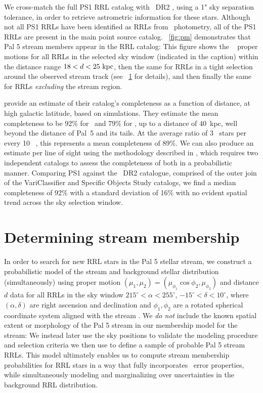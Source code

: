 \documentclass[twocolumn]{aastex63}
\begin{document}
We cross-match the full PS1 RRL catalog with \Gaia~DR2 \citep{Gaia:2018}, using a 1" sky separation tolerance, in order to retrieve astrometric information for these stars.
Although not all PS1 RRLs have been identified as RRLs from \Gaia\ photometry, all of the PS1 RRLs are present in the main point source catalog.
\figurename~\ref{fig:pm} demonstrates that Pal 5 stream members appear in the RRL catalog: This figure shows the \Gaia\  proper motions for all RRLs in the selected sky window (indicated in the caption) within the distance range $18 < d < 25~\mathrm{kpc}$, then the same for RRLs in a tight selection around the observed stream track (see \sectionname~\ref{sec:membership} for details), and then finally the same for RRLs \emph{excluding} the stream region.

\citet{Sesar:2017b} provide an estimate of their catalog's completeness as a function of distance, at high galactic latitude, based on simulations. They estimate the mean completeness to be 92\% for \rrab~and 79\% for \rrc, up to a distance of 40~kpc, well beyond the distance of Pal~5 and its tails. At the average ratio of 3 \rrc~stars per every 10 \rrab~\citep{Layden:1995}, this represents a mean completeness of 89\%. We can also produce an estimate per line of sight using the methodology described in \citet{Rybizki:2018}, which requires two independent catalogs to assess the completeness of both in a probabilistic manner. Comparing PS1 against the \Gaia~DR2 catalogue, comprised of the outer join of the VariClassifier \citep{Holl2018,Rimoldini2018} and Specific Objects Study \citep{Clementini2018} catalogs, we find a median completeness of 92\% with a standard deviation of 16\% with no evident spatial trend across the sky selection window.

\section{Determining stream membership} \label{sec:membership}

In order to search for new RRL stars in the Pal 5 stellar stream, we construct a probabilistic model of the stream and background stellar distribution (simultaneously) using proper motion $(\mu_1, \mu_2) = (\mu_{\phi_1}\cos\phi_2, \mu_{\phi_2})$ and distance $d$ data for all RRLs in the sky window $215^\circ < \alpha < 255^\circ$, $-15^\circ < \delta < 10^\circ$, where $(\alpha, \delta)$ are right ascension and declination and $\phi_1, \phi_2$ are a rotated spherical coordinate system aligned with the stream \citep{Bonaca:2019}.
We \emph{do not} include the known spatial extent or morphology of the Pal 5 stream in our membership model for the stream: We instead later use the sky positions to validate the modeling procedure and selection criteria we then use to define a sample of probable Pal 5 stream RRLs.
This model ultimately enables us to compute stream membership probabilities for RRL stars in a way that fully incorporates \Gaia\ error properties, while simultaneously modeling and marginalizing over uncertainties in the background RRL distribution.
\end{document}
